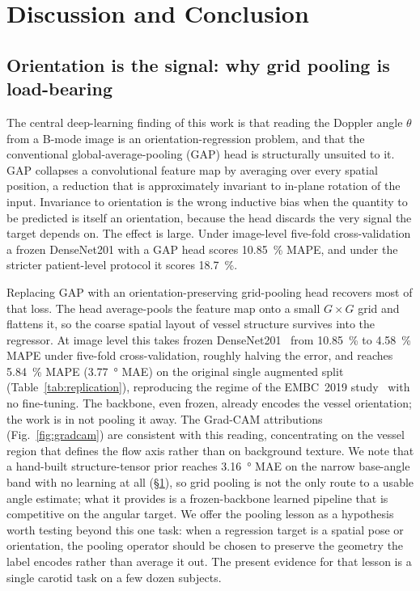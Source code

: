 \section{Discussion and Conclusion}
\label{sec:discussion}

\subsection{Orientation is the signal: why grid pooling is load-bearing}

The central deep-learning finding of this work is that reading the Doppler angle
$\theta$ from a B-mode image is an orientation-regression problem, and that the
conventional global-average-pooling (GAP) head is structurally unsuited to it.
GAP collapses a convolutional feature map by averaging over every spatial
position, a reduction that is approximately invariant to in-plane rotation of the
input. Invariance to orientation is the wrong inductive bias when the quantity to
be predicted is itself an orientation, because the head discards the very signal
the target depends on. The effect is large. Under image-level five-fold
cross-validation a frozen DenseNet201 with a GAP head scores
\SI{10.85}{\percent} MAPE, and under the stricter patient-level protocol it scores
\SI{18.7}{\percent}.

Replacing GAP with an orientation-preserving grid-pooling head recovers most of
that loss. The head average-pools the feature map onto a small $G\times G$ grid
and flattens it, so the coarse spatial layout of vessel structure survives into
the regressor. At image level this takes frozen DenseNet201~\citep{Huang2017} from
\SI{10.85}{\percent} to \SI{4.58}{\percent} MAPE under five-fold cross-validation,
roughly halving the error, and reaches \SI{5.84}{\percent} MAPE
(\SI{3.77}{\degree} MAE) on the original single augmented split
(Table~\ref{tab:replication}), reproducing the regime of the EMBC~2019
study~\citep{Patil2019} with no fine-tuning. The backbone, even frozen, already
encodes the vessel orientation; the work is in not pooling it away. The Grad-CAM
attributions~\citep{Selvaraju2017} (Fig.~\ref{fig:gradcam}) are consistent with
this reading, concentrating on the vessel region that defines the flow axis rather
than on background texture. We note that a hand-built structure-tensor prior reaches
\SI{3.16}{\degree} MAE on the narrow base-angle band with no learning at all
(\S\ref{sec:discussion}), so grid pooling is not the only route to a usable angle
estimate; what it provides is a frozen-backbone learned pipeline that is competitive
on the angular target. We offer the pooling lesson as a hypothesis worth testing
beyond this one task: when a regression target is a spatial pose or orientation, the
pooling operator should be chosen to preserve the geometry the label encodes rather
than average it out. The present evidence for that lesson is a single carotid task on
a few dozen subjects.

